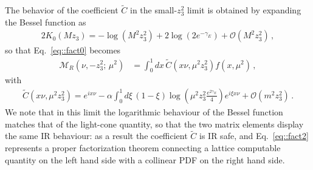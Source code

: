 The behavior of the coefficient $\tilde{C}$ in the small-$z_3^2$ limit is
obtained by expanding the Bessel function as 
\begin{align}
	\label{eq::besselexpansion}
        2K_0\left(M z_3\right) = - \log\left(M^2 z_3^2\right) 
        + 2 \log\left(2e^{-\gamma_E}\right) + \mathcal{O}\left(M^2 z_3^2\right)\, ,
\end{align} 
so that Eq.~\eqref{eq::fact0} becomes
\begin{align}
	\label{eq::fact2}
	\mathcal{M}_R\left(\nu, -z_3^2; \, \mu^2\right) &=  
	\int_{0}^{1} dx \, \tilde{C}\left(x\nu,\mu^2 z_3^2 \right) 
	f\left(x,\mu^2\right)\, ,
\end{align}
with
\begin{align}
	\label{eq::Cpseudo0}
	\tilde{C}\left(x\nu,\mu^2 z_3^2 \right) =
	 e^{i x\nu} - \alpha\int_0^1 d\xi \, 
	 \left(1-\xi\right) 
	 \log\left( \mu^2 z_3^2\frac{e^{2\gamma_E}}{4} \right) e^{i \xi x\nu}
	 + \mathcal{O}\left(m^2 z_3^2\right)\, .
\end{align}
We note that in this limit the logarithmic behaviour of the Bessel function
matches that of the light-cone quantity, so that the two matrix elements display
the same IR behaviour: as a result the coefficient $\tilde{C}$ is IR safe, and
Eq.~\eqref{eq::fact2} represents a proper factorization theorem connecting a
lattice computable quantity on the left hand side with a collinear PDF on the
right hand side. 

